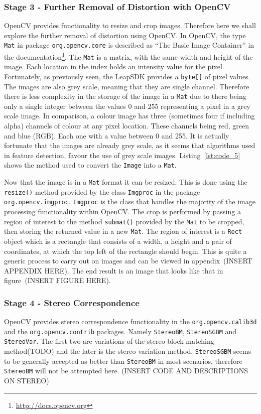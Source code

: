 \documentclass[11pt,oneside]{report}
\newcommand\code[1]{\texttt{#1}}
\begin{document}
		\subsubsection{Stage 3 - Further Removal of Distortion with OpenCV}
		OpenCV provides functionality to resize and crop images.
		Therefore here we shall explore the further removal of distortion using OpenCV.
		In OpenCV, the type \code{Mat} in package \code{org.opencv.core} is described as ``The Basic Image Container'' in the documentation\footnote{\url{http://docs.opencv.org}}.
		The \code{Mat} is a matrix, with the same width and height of the image.
		Each location in the index holds an intensity value for the pixel.
		Fortunately, as previously seen, the LeapSDK provides a \code{byte[]} of pixel values.
		The images are also grey scale, meaning that they are single channel.
		Therefore there is less complexity in the storage of the image in a \code{Mat} due to there being only a single integer between the values 0 and 255 representing a pixel in a grey scale image.
		In comparison, a colour image has three (sometimes four if including alpha) channels of colour at any pixel location.
		These channels being red, green and blue (RGB).
		Each one with a value between 0 and 255.
		It is actually fortunate that the images are already grey scale, as it seems that algorithms used in feature detection, favour the use of grey scale images.
		Listing~\ref{lst:code_5} shows the method used to convert the \code{Image} into a \code{Mat}.
		
		Now that the image is in a \code{Mat} format it can be resized.
		This is done using the \code{resize()} method provided by the class \code{Imgproc} in the package \code{org.opencv.imgproc}.
		\code{Imgproc} is the class that handles the majority of the image processing functionality within OpenCV.
		The crop is performed by passing a region of interest to the method \code{submat()} provided by the \code{Mat} to be cropped, then storing the returned value in a new \code{Mat}.
		The region of interest is a \code{Rect} object which is a rectangle that consists of a width, a height and a pair of coordinates, at which the top left of the rectangle should begin.
		This is quite a generic process to carry out on images and can be viewed in appendix~(INSERT APPENDIX HERE).
		The end result is an image that looks like that in figure~(INSERT FIGURE HERE).
		
		\subsubsection{Stage 4 - Stereo Correspondence}
		OpenCV provides stereo correspondence functionality in the \code{org.opencv.calib3d} and the \code{org.opencv.contrib} packages.
		Namely \code{StereoBM}, \code{StereoSGBM} and \code{StereoVar}.
		The first two are variations of the stereo block matching method(TODO) and the later is the stereo variation method.
		\code{StereoSGBM} seems to be generally accepted as better than \code{StereoBM} in most scenarios, therefore \code{StereoBM} will not be attempted here.
		(INSERT CODE AND DESCRIPTIONS ON STEREO)
		
\end{document}

